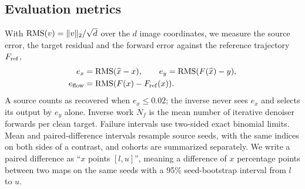 \subsection{Evaluation metrics}
\label{sec:metrics}
With $\operatorname{RMS}(v)=\|v\|_2/\sqrt d$ over the $d$ image coordinates, we measure the source error, the target residual and the forward error against the reference trajectory $F_{\rm ref}$,
\begin{align}
 e_x&=\operatorname{RMS}(\widehat x-x),\qquad e_y=\operatorname{RMS}(F(\widehat x)-y),\nonumber\\
 e_{\rm flow}&=\operatorname{RMS}(F(x)-F_{\rm ref}(x)).
 \label{eq:metrics}
\end{align}
A source counts as recovered when $e_x\le0.02$; the inverse never sees $e_x$ and selects its output by $e_y$ alone. Inverse work $N_f$ is the mean number of iterative denoiser forwards per clean target. Failure intervals use two-sided exact binomial limits. Mean and paired-difference intervals resample source seeds, with the same indices on both sides of a contrast, and cohorts are summarized separately. We write a paired difference as ``$x$ points $[l,u]$'', meaning a difference of $x$ percentage points between two maps on the same seeds with a 95\% seed-bootstrap interval from $l$ to $u$.
